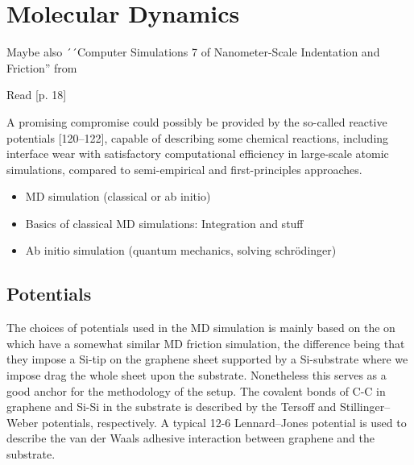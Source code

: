 


\section{Molecular Dynamics}


Maybe also ´´Computer Simulations 7 of Nanometer-Scale Indentation
and Friction'' from \cite{BHUSHAN20051507}

Read \cite{Manini_2016}[p. 18]

A promising compromise could possibly be provided by the so-called reactive potentials [120–122], capable of describing some chemical reactions, including interface wear with satisfactory computational efficiency in large-scale atomic simulations, compared to semi-empirical and first-principles approaches. \cite{Manini_2016}




\begin{itemize}
  \item MD simulation (classical or ab initio)
  \item Basics of classical MD simulations: Integration and stuff
  \item Ab initio simulation (quantum mechanics, solving schrödinger)
\end{itemize}





\subsection{Potentials}

The choices of potentials used in the MD simulation is mainly based on the on
\cite{li_evolving_2016} which have a somewhat similar MD friction simulation,
the difference being that they impose a Si-tip on the graphene sheet supported
by a Si-substrate where we impose drag the whole sheet upon the substrate.
Nonetheless this serves as a good anchor for the methodology of the setup. The
covalent bonds of C-C in graphene and Si-Si in the substrate is described by the
Tersoff and Stillinger–Weber potentials, respectively. A typical 12-6
Lennard–Jones potential is used to describe the van der Waals adhesive
interaction between graphene and the substrate. \\

